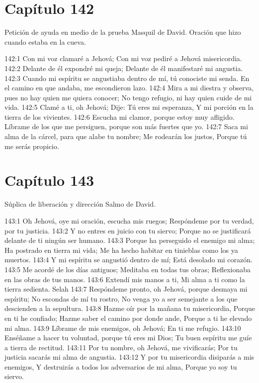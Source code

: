\section*{Capítulo 142}
Petición de ayuda en medio de la prueba 
Masquil de David. Oración que hizo cuando estaba en la cueva. 
 
142:1 Con mi voz clamaré a Jehová; 
Con mi voz pediré a Jehová misericordia. 
142:2 Delante de él expondré mi queja; 
Delante de él manifestaré mi angustia. 
142:3 Cuando mi espíritu se angustiaba dentro de mí, tú conociste mi senda. 
En el camino en que andaba, me escondieron lazo. 
142:4 Mira a mi diestra y observa, pues no hay quien me quiera conocer; 
No tengo refugio, ni hay quien cuide de mi vida. 
142:5 Clamé a ti, oh Jehová; 
Dije: Tú eres mi esperanza, 
Y mi porción en la tierra de los vivientes. 
142:6 Escucha mi clamor, porque estoy muy afligido. 
Líbrame de los que me persiguen, porque son más fuertes que yo. 
142:7 Saca mi alma de la cárcel, para que alabe tu nombre; 
Me rodearán los justos, 
Porque tú me serás propicio. 
\section*{Capítulo 143}
Súplica de liberación y dirección 
Salmo de David. 
 
143:1 Oh Jehová, oye mi oración, escucha mis ruegos; 
Respóndeme por tu verdad, por tu justicia. 
143:2 Y no entres en juicio con tu siervo; 
Porque no se justificará delante de ti ningún ser humano. 
143:3 Porque ha perseguido el enemigo mi alma; 
Ha postrado en tierra mi vida; 
Me ha hecho habitar en tinieblas como los ya muertos. 
143:4 Y mi espíritu se angustió dentro de mí; 
Está desolado mi corazón. 
143:5 Me acordé de los días antiguos; 
Meditaba en todas tus obras; 
Reflexionaba en las obras de tus manos. 
143:6 Extendí mis manos a ti, 
Mi alma a ti como la tierra sedienta. Selah 
143:7 Respóndeme pronto, oh Jehová, porque desmaya mi espíritu; 
No escondas de mí tu rostro, 
No venga yo a ser semejante a los que descienden a la sepultura. 
143:8 Hazme oír por la mañana tu misericordia, 
Porque en ti he confiado; 
Hazme saber el camino por donde ande, 
Porque a ti he elevado mi alma. 
143:9 Líbrame de mis enemigos, oh Jehová; 
En ti me refugio. 
143:10 Enséñame a hacer tu voluntad, porque tú eres mi Dios; 
Tu buen espíritu me guíe a tierra de rectitud. 
143:11 Por tu nombre, oh Jehová, me vivificarás; 
Por tu justicia sacarás mi alma de angustia. 
143:12 Y por tu misericordia disiparás a mis enemigos, 
Y destruirás a todos los adversarios de mi alma, 
Porque yo soy tu siervo. 
